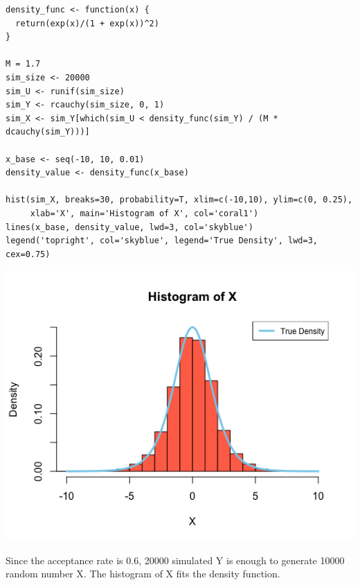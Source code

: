 \documentclass[12pt,letterpaper]{article}
\begin{document}
\begin{verbatim}
density_func <- function(x) {
  return(exp(x)/(1 + exp(x))^2)
}

M = 1.7
sim_size <- 20000
sim_U <- runif(sim_size)
sim_Y <- rcauchy(sim_size, 0, 1)
sim_X <- sim_Y[which(sim_U < density_func(sim_Y) / (M * dcauchy(sim_Y)))]

x_base <- seq(-10, 10, 0.01)
density_value <- density_func(x_base)

hist(sim_X, breaks=30, probability=T, xlim=c(-10,10), ylim=c(0, 0.25),
     xlab='X', main='Histogram of X', col='coral1')
lines(x_base, density_value, lwd=3, col='skyblue')
legend('topright', col='skyblue', legend='True Density', lwd=3, cex=0.75)
\end{verbatim}

\includegraphics[width=150mm]{hist_X.png}

\noindent Since the acceptance rate is 0.6, 20000 simulated Y is enough to generate 10000 random number X. The histogram of X fits the density function.

\end{document}
